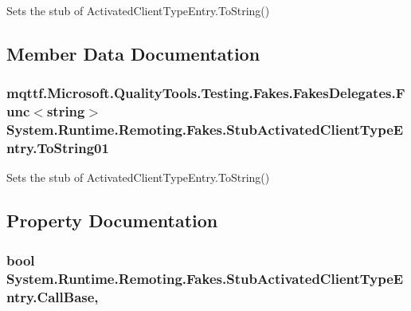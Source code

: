 Sets the stub of Activated\-Client\-Type\-Entry.\-To\-String()



\subsection{Member Data Documentation}
\hypertarget{class_system_1_1_runtime_1_1_remoting_1_1_fakes_1_1_stub_activated_client_type_entry_a55c95c427f573acaa86f830662112678}{
\subsubsection[{To\-String01}]{\setlength{\rightskip}{0pt plus 5cm}mqttf.\-Microsoft.\-Quality\-Tools.\-Testing.\-Fakes.\-Fakes\-Delegates.\-Func$<$string$>$ System.\-Runtime.\-Remoting.\-Fakes.\-Stub\-Activated\-Client\-Type\-Entry.\-To\-String01}}\label{class_system_1_1_runtime_1_1_remoting_1_1_fakes_1_1_stub_activated_client_type_entry_a55c95c427f573acaa86f830662112678}


Sets the stub of Activated\-Client\-Type\-Entry.\-To\-String()



\subsection{Property Documentation}
\hypertarget{class_system_1_1_runtime_1_1_remoting_1_1_fakes_1_1_stub_activated_client_type_entry_acaade506dc50f26dcd2d189aac065542}{
\subsubsection[{Call\-Base}]{\setlength{\rightskip}{0pt plus 5cm}bool System.\-Runtime.\-Remoting.\-Fakes.\-Stub\-Activated\-Client\-Type\-Entry.\-Call\-Base\hspace{0.3cm}{\ttfamily [get]}, {\ttfamily [set]}}}\label{class_system_1_1_runtime_1_1_remoting_1_1_fakes_1_1_stub_activated_client_type_entry_acaade506dc50f26dcd2d189aac065542}


